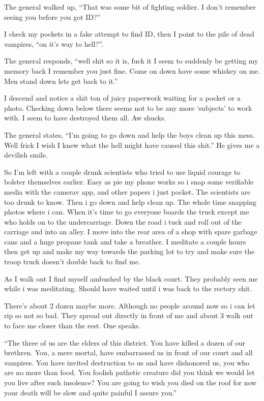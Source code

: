 The general walked up, ``That was some bit of fighting soldier. I don't remember seeing you before you got ID?'' 

I check my pockets in a fake attempt to find ID, then I point to the pile of dead vampires, ``on it's way to hell?''. 

The general responds, ``well shit so it is, fuck it I seem to suddenly be getting my memory back I remember you just fine. Come on down have some whiskey on me. Men stand down lets get back to it.'' 

I descend and notice a shit ton of juicy paperwork waiting for a pocket or a photo. Checking down below there seems not to be any more `subjects' to work with. I seem to have destroyed them all. Aw shucks. 

The general states, ``I'm going to go down and help the boys clean up this mess. Well frick I wish I knew what the hell might have caused this shit.'' He gives me a devilish smile.

So I'm left with a couple drunk scientists who tried to use liquid courage to bolster themselves earlier. Easy as pie my phone works so i snap some verifiable media with the camerav app, and other papers i just pocket. The scientists are too drunk to know. Then i go down and help clean up. The whole time snapping photos where i can. When it's time to go everyone boards the truck except me who holds on to the undercarriage. Down the road i tuck and roll out of the carriage and into an alley. I move into the rear area of a shop with spare garbage cans and a huge propane tank and take a breather. I meditate a couple hours then get up and make my way towards the parking lot to try and make sure the troop truck doesn't double back to find me.

As I walk out I find myself ambushed by the black court. They probably seen me while i was meditating. Should have waited until i was back to the rectory shit.

There's about 2 dozen maybe more. Although no people around now so i can let rip so not so bad. They spread out directly in front of me and about 3 walk out to face me closer than the rest. One speaks.

``The three of us are the elders of this district. You have killed a dozen of our brethren. You, a mere mortal, have embarrassed us in front of our court and all vampires. You have invited destruction to us and have dishonored us, you who are no more than food. You foolish pathetic creature did you think we would let you live after such insolence? You are going to wish you died on the roof for now your death will be slow and quite painful I assure you.''

